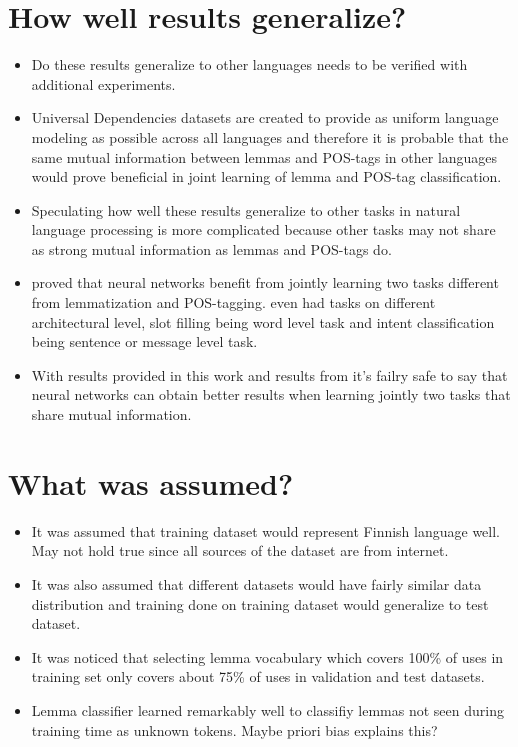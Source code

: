 \documentclass[12pt,a4paper,english
]{tutthesis}
\begin{document}
\section{How well results generalize?}
\begin{itemize}
\item Do these results generalize to other languages needs to be verified with additional experiments.
\item Universal Dependencies datasets are created to provide as uniform language modeling as possible across all languages and therefore it is probable that the same mutual information between lemmas and POS-tags in other languages would prove beneficial in joint learning of lemma and POS-tag classification.
\item Speculating how well these results generalize to other tasks in natural language processing is more complicated because other tasks may not share as strong mutual information as lemmas and POS-tags do.
\item \cite{Liang2016a} proved that neural networks benefit from jointly learning two tasks different from lemmatization and POS-tagging. \cite{Liu2016a} even had tasks on different architectural level, slot filling being word level task and intent classification being sentence or message level task.
\item With results provided in this work and results from \cite{Liu2016a} it's failry safe to say that neural networks can obtain better results when learning jointly two tasks that share mutual information.
\end{itemize}

\section{What was assumed?}
\begin{itemize}
\item It was assumed that training dataset would represent Finnish language well. May not hold true since all sources of the dataset are from internet.
\item It was also assumed that different datasets would have fairly similar data distribution and training done on training dataset would generalize to test dataset.
\item It was noticed that selecting lemma vocabulary which covers 100\% of uses in training set only covers about 75\% of uses in validation and test datasets.
\item Lemma classifier learned remarkably well to classifiy lemmas not seen during training time as unknown tokens. Maybe priori bias explains this?
\end{itemize}
\end{document}
